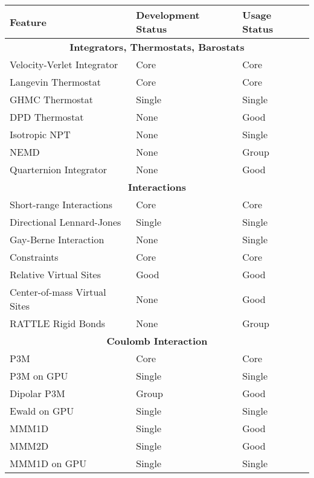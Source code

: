 \newpage
{}
\begin{longtable}{|l|l|l|}
  \hline
  \textbf{Feature} & \textbf{Development Status} & \textbf{Usage Status}\\\hline%
  \multicolumn{3}{|c|}{\textbf{Integrators, Thermostats, Barostats}} \\
  Velocity-Verlet Integrator          & Core   & Core   \\
  Langevin Thermostat                 & Core   & Core   \\
  GHMC Thermostat                     & Single & Single \\
  DPD Thermostat                      & None   & Good   \\
  Isotropic NPT                       & None   & Single \\
  NEMD                                & None   & Group  \\
  Quarternion Integrator              & None   & Good   \\
  \multicolumn{3}{|c|}{\textbf{Interactions}} \\
  Short-range Interactions            & Core   & Core   \\
  Directional Lennard-Jones           & Single & Single \\
  Gay-Berne Interaction               & None   & Single \\
  Constraints                         & Core   & Core   \\
  Relative Virtual Sites              & Good   & Good   \\
  Center-of-mass Virtual Sites        & None   & Good   \\
  RATTLE Rigid Bonds                  & None   & Group  \\
  \multicolumn{3}{|c|}{\textbf{Coulomb Interaction}} \\
  P3M                                 & Core   & Core   \\
  P3M on GPU                          & Single & Single \\
  Dipolar P3M                         & Group  & Good   \\
  Ewald on GPU                        & Single & Single \\
  MMM1D                               & Single & Good   \\
  MMM2D                               & Single & Good   \\
  MMM1D on GPU                        & Single & Single \\

\end{longtable}
